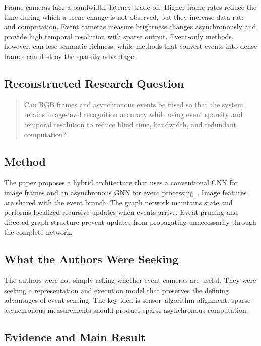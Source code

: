 Frame cameras face a bandwidth--latency trade-off. Higher frame rates reduce the time during which a scene change is not observed, but they increase data rate and computation. Event cameras measure brightness changes asynchronously and provide high temporal resolution with sparse output. Event-only methods, however, can lose semantic richness, while methods that convert events into dense frames can destroy the sparsity advantage.

\subsection{Reconstructed Research Question}

\begin{quote}
Can RGB frames and asynchronous events be fused so that the system retains image-level recognition accuracy while using event sparsity and temporal resolution to reduce blind time, bandwidth, and redundant computation?
\end{quote}

\subsection{Method}

The paper proposes a hybrid architecture that uses a conventional CNN for image frames and an asynchronous GNN for event processing~\cite{gehrig2024lowlatency}. Image features are shared with the event branch. The graph network maintains state and performs localized recursive updates when events arrive. Event pruning and directed graph structure prevent updates from propagating unnecessarily through the complete network.

\subsection{What the Authors Were Seeking}

The authors were not simply asking whether event cameras are useful. They were seeking a representation and execution model that preserves the defining advantages of event sensing. The key idea is sensor--algorithm alignment: sparse asynchronous measurements should produce sparse asynchronous computation.

\subsection{Evidence and Main Result}

